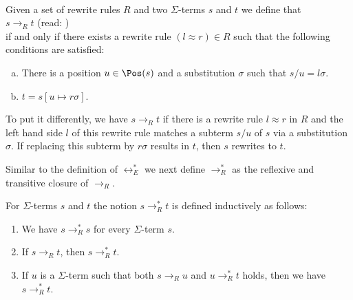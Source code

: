 \begin{Definition} \hspace*{\fill} \\
  Given a set of rewrite rules $R$ and two $\Sigma$-terms $s$ and $t$ we define that
  \\[0.2cm]
  \hspace*{1.3cm}
  $s \rightarrow_R t$ \quad (read: )
  \\[0.2cm]
  if and only if there exists a rewrite rule $(l \approx r) \in R$ such that the following conditions are satisfied:
  \begin{enumerate}[(a)]
  \item There is a position $u \in \Pos(s)$ and a substitution $\sigma$ such that $s/u = l\sigma$.
  \item $t = s[u \mapsto r\sigma]$. \eox
  \end{enumerate}
\end{Definition}

To put it differently, we have $s \rightarrow_R t$ if there is a rewrite rule $l \approx r$ in $R$ and the left hand
side $l$ of this rewrite rule matches a subterm $s/u$ of $s$ via a substitution $\sigma$.  If replacing this
subterm by $r\sigma$ results in $t$, then $s$ rewrites to $t$.

Similar to the definition of $\leftrightarrow_E^*$  we next define $\rightarrow_R^*$ as the reflexive and transitive closure of $\rightarrow_R$.
\begin{Definition}[$\rightarrow_R^*$]
  For $\Sigma$-terms $s$ and $t$ the notion $s \rightarrow_R^* t$ is defined inductively as follows:
  \begin{enumerate}
  \item We have $s \rightarrow_R^* s$ for every $\Sigma$-term $s$.
  \item If $s \rightarrow_R t$, then $s \rightarrow_R^* t$.
  \item If $u$ is a $\Sigma$-term such that both $s \rightarrow_R u$ and $u \rightarrow_R^* t$ holds,
        then we have $s \rightarrow_R^* t$. \eod
  \end{enumerate}
\end{Definition}

